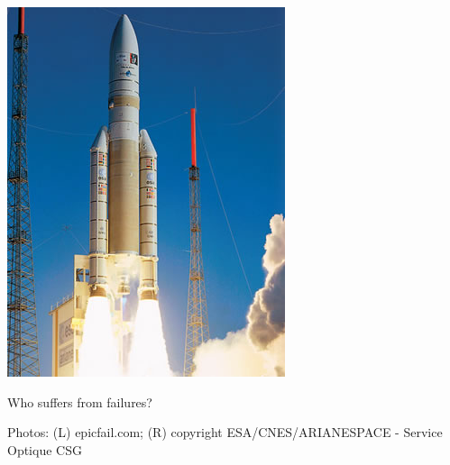 \documentclass{beamer}
\newenvironment{changemargin}[1]{%
  \begin{list}{}{%
    \setlength{\topsep}{0pt}%
    \setlength{\leftmargin}{#1}%
    \setlength{\rightmargin}{1em}
    \setlength{\listparindent}{\parindent}%
    \setlength{\itemindent}{\parindent}%
    \setlength{\parsep}{\parskip}%
  }%
  \item[]}{\end{list}}
\begin{document}
\begin{frame}
\begin{changemargin}{2em}
\begin{center}
\includegraphics[height=.5\textheight]{L01/s2_2sm.jpg}
\end{center}

Who suffers from failures?
  \end{changemargin}


{\tiny Photos: (L) epicfail.com; (R) copyright ESA/CNES/ARIANESPACE - Service Optique CSG}

\end{frame}
\end{document}

